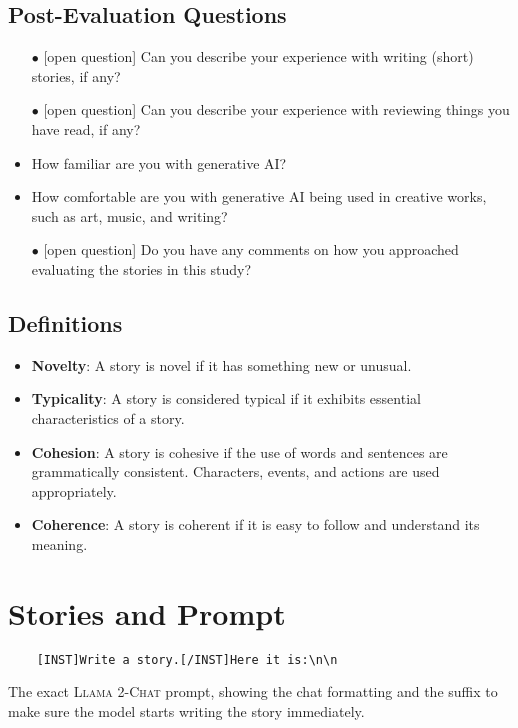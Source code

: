 \documentclass[a4paper]{article}
\begin{document}
\subsection*{Post-Evaluation Questions}
\begin{itemize}
    \item[\tiny$\bullet$] [open question] Can you describe your experience with writing (short) stories, if any?
    \item[\tiny$\bullet$] [open question] Can you describe your experience with reviewing things you have read, if any?
    \item How familiar are you with generative AI?
    \item How comfortable are you with generative AI being used in creative works, such as art, music,
and writing?
    \item[\tiny$\bullet$] [open question] Do you have any comments on how you approached evaluating the stories in this study?
\end{itemize}

\subsection*{Definitions}
\begin{itemize}
\item \textbf{Novelty}: A story is novel if it has something new or unusual. 
\item \textbf{Typicality}: A story is considered typical if it exhibits essential characteristics of a story.
\item \textbf{Cohesion}: A story is cohesive if the use of words and sentences are grammatically consistent. Characters, events, and actions are used appropriately.
\item \textbf{Coherence}: A story is coherent if it is easy to follow and understand its meaning.
\end{itemize}
\vfill

\newpage
\section{Stories and Prompt}

\begin{prompt}[!ht]
    \small
    \begin{lstlisting}
    [INST]Write a story.[/INST]Here it is:\n\n
    \end{lstlisting}
    \caption{The exact \textsc{Llama 2-Chat} prompt, showing the chat formatting and the suffix to make sure the model starts writing the story immediately.}\label{fig:exact-llama-2-prompt}
\end{prompt}
\end{document}
